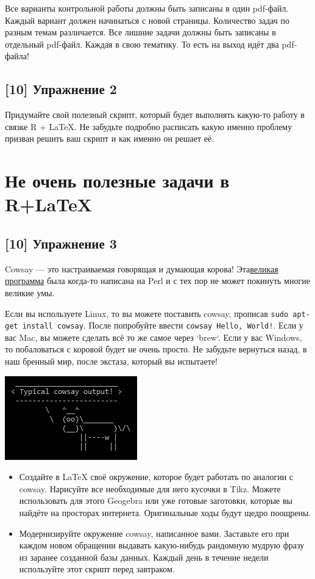 \documentclass[12pt, a4paper, oneside]{article}
\begin{document}
Все варианты контрольной работы должны быть записаны в один pdf-файл. Каждый вариант должен начинаться с новой страницы. Количество задач по разным темам различается. Все лишние задачи должны быть записаны в отдельный pdf-файл. Каждая в свою тематику. То есть на выход идёт два pdf-файла!


\subsection*{[10]  Упражнение 2}

Придумайте свой полезный скрипт, который будет выполнять какую-то работу в связке R + \LaTeX{}. Не забудьте подробно расписать какую именно проблему призван решить ваш скрипт и как именно он решает её.


\section*{Не очень полезные задачи в R+LaTeX}

\subsection*{[10]  Упражнение 3}

Cowsay — это настраиваемая говорящая и думающая корова! Эта\href{http://citkit.ru/articles/679/}{великая программа} была когда-то написана на Perl и с тех пор не может покинуть многие великие умы.

Если вы используете Linux, то вы можете поставить cowsay, прописав \texttt{sudo apt-get install cowsay}. После попробуйте ввести \texttt{cowsay Hello, World!}. Если у вас Mac, вы можете сделать всё то же самое через `brew`. Если у вас Windows, то побаловаться с коровой будет не очень просто. Не забудьте вернуться назад, в наш бренный мир, после экстаза, который вы испытаете!

\begin{center}
	\includegraphics[scale=1]{Cowsay_Typical_Output.png}
\end{center}

\begin{itemize}
	\item Создайте в LaTeX своё окружение, которое будет работать по аналогии с cowsay. Нарисуйте все необходимые для него кусочки в Tikz. Можете использовать для этого Geogebra или уже готовые заготовки, которые вы найдёте на просторах интернета. Оригинальные ходы будут щедро поощрены.
	
	\item Модернизируйте окружение cowsay, написанное вами. Заставьте его при каждом новом обращении выдавать какую-нибудь рандомную мудрую фразу из заранее созданной базы данных. Каждый день в течение недели используйте этот скрипт перед завтраком.
\end{itemize}
\end{document}
